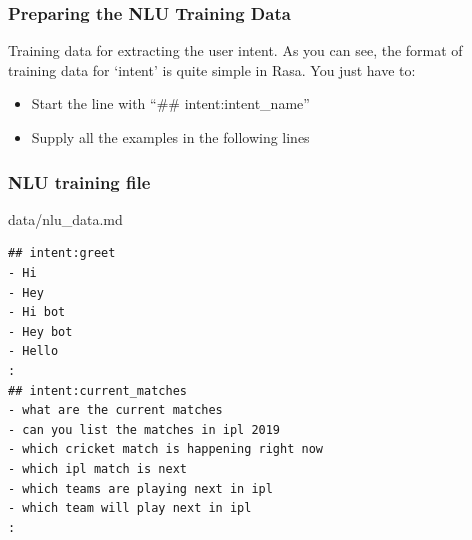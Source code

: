 



 \begin{frame}[fragile]\frametitle{Preparing the NLU Training Data}
Training data for extracting the user intent. As you can see, the format of training data for `intent' is quite simple in Rasa. You just have to:
\begin{itemize}
\item Start the line with ``\#\# intent:intent\_name''
\item Supply all the examples in the following lines
\end{itemize}

\end{frame}

 \begin{frame}[fragile]\frametitle{NLU training file}
data/nlu\_data.md

\begin{lstlisting}
## intent:greet
- Hi
- Hey
- Hi bot
- Hey bot
- Hello
:
## intent:current_matches
- what are the current matches
- can you list the matches in ipl 2019
- which cricket match is happening right now
- which ipl match is next
- which teams are playing next in ipl
- which team will play next in ipl
:
\end{lstlisting}
\end{frame}

